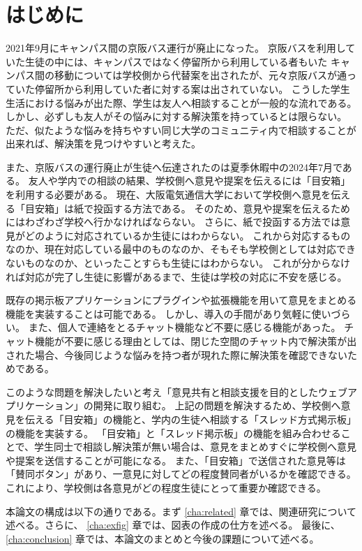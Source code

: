 \documentclass[main]{subfiles}
\begin{document}
\chapter{はじめに}
\label{cha:intro}

2021年9月にキャンパス間の京阪バス運行が廃止になった。
京阪バスを利用していた生徒の中には、キャンパスではなく停留所から利用している者もいた
キャンパス間の移動については学校側から代替案を出されたが、元々京阪バスが通っていた停留所から利用していた者に対する案は出されていない。
こうした学生生活における悩みが出た際、学生は友人へ相談することが一般的な流れである。
しかし、必ずしも友人がその悩みに対する解決策を持っているとは限らない。
ただ、似たような悩みを持ちやすい同じ大学のコミュニティ内で相談することが出来れば、解決策を見つけやすいと考えた。

また、京阪バスの運行廃止が生徒へ伝達されたのは夏季休暇中の2024年7月である。
友人や学内での相談の結果、学校側へ意見や提案を伝えるには「目安箱」を利用する必要がある。
現在、大阪電気通信大学において学校側へ意見を伝える「目安箱」は紙で投函する方法である。
そのため、意見や提案を伝えるためにはわざわざ学校へ行かなければならない。
さらに、紙で投函する方法では意見がどのように対応されているか生徒にはわからない。
これから対応するものなのか、現在対応している最中のものなのか、そもそも学校側としては対応できないものなのか、といったことすらも生徒にはわからない。
これが分からなければ対応が完了し生徒に影響があるまで、生徒は学校の対応に不安を感じる。

既存の掲示板アプリケーションにプラグインや拡張機能を用いて意見をまとめる機能を実装することは可能である。
しかし、導入の手間があり気軽に使いづらい。
また、個人で連絡をとるチャット機能など不要に感じる機能があった。
チャット機能が不要に感じる理由としては、閉じた空間のチャット内で解決策が出された場合、今後同じような悩みを持つ者が現れた際に解決策を確認できないためである。

このような問題を解決したいと考え「意見共有と相談支援を目的としたウェブアプリケーション」の開発に取り組む。
上記の問題を解決するため、学校側へ意見を伝える「目安箱」の機能と、学内の生徒へ相談する「スレッド方式掲示板」の機能を実装する。
「目安箱」と「スレッド掲示板」の機能を組み合わせることで、学生同士で相談し解決策が無い場合は、意見をまとめすぐに学校側へ意見や提案を送信することが可能になる。
また、「目安箱」で送信された意見等は「賛同ボタン」があり、一意見に対してどの程度賛同者がいるかを確認できる。
これにより、学校側は各意見がどの程度生徒にとって重要か確認できる。



本論文の構成は以下の通りである。まず \ref{cha:related} 章では、関連研究について述べる。さらに、
\ref{cha:exfig} 章では、図表の作成の仕方を述べる。
最後に、\ref{cha:conclusion} 章では、本論文のまとめと今後の課題について述べる。
\end{document}
